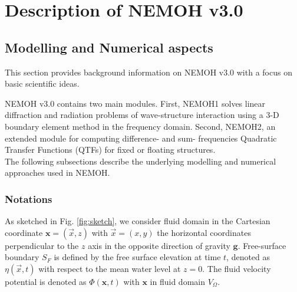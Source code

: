 \documentclass[12pt,a4paper,titlepage]{article}
\newcommand{\bs}{\boldsymbol}
\begin{document}

\newpage
\section{Description of NEMOH v3.0}\label{Sec:Descrip_NEMOH}
\subsection{Modelling and Numerical aspects}
This section provides background information on NEMOH v3.0 with a focus on basic scientific ideas.

NEMOH v3.0 contains two main modules. First, NEMOH1 solves linear diffraction and radiation problems of wave-structure interaction using a 3-D boundary element method in the frequency domain. Second, NEMOH2, an extended module for computing difference- and sum- frequencies Quadratic Transfer Functions (QTFs) for fixed or floating structures.\\

The following subsections describe the underlying modelling and numerical approaches used in NEMOH.

\subsubsection*{Notations}
As sketched in Fig. \ref{fig:sketch}, we consider fluid domain in the Cartesian coordinate $\bs x=(\vec{x},z)$ with $\vec{x}=(x,y)$ the horizontal coordinates perpendicular to the $z$ axis in the opposite direction of gravity $\bs g$. Free-surface boundary $S_F$ is defined by the free surface elevation at time $t$, denoted as $\eta(\vec{x},t)$ with respect to the mean water level at $z=0$. The fluid velocity potential is denoted as $\Phi(\bs x,t)$ with $\bs x$ in fluid domain $V_{\Omega}$.
\end{document}
